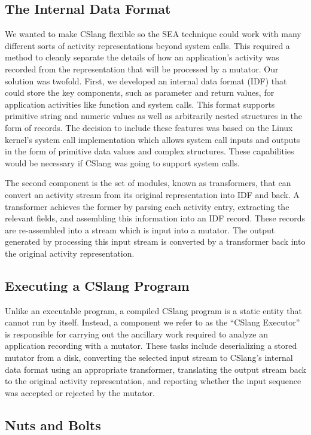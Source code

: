 \subsection{The Internal Data Format}

We wanted to make CSlang flexible
so the SEA technique
could
work with many different sorts of
activity representations beyond system calls.
This required a method to cleanly separate the details of how
an application's activity was recorded from the representation that will be
processed by a mutator.
Our solution was twofold.  First, we developed an internal data format
(IDF) that
could store the key components, such as parameter and return values,
for application activities like function
and system calls.  This format supports primitive string and numeric
values as well as arbitrarily nested structures in the form of records.
The decision to include these features
was based on the Linux kernel's system call implementation
which allows system call inputs and outputs in the form of primitive data
values and complex structures.
These capabilities would be necessary
if CSlang was going to support system calls.

The second component is the set of modules, known as transformers, that can
convert an activity stream from its original representation into IDF and
back.  A transformer achieves the former by parsing each activity entry,
extracting the relevant fields, and assembling this information into an IDF
record.  These records are re-assembled into a stream which is input into a
mutator.
The output generated by processing this input stream
is converted by a transformer
back into the original activity representation.

\subsection{Executing a CSlang Program}

Unlike an executable program, a compiled CSlang program is a static entity
that cannot run by itself.  Instead, a component we refer to as the
``CSlang Executor'' is responsible for carrying out the ancillary work
required to analyze an application recording with a mutator.
These tasks include deserializing a stored mutator from a disk,
converting the selected input stream
to CSlang's internal data format
using an appropriate transformer,
translating the output stream back to the original activity representation,
and reporting whether the input sequence was
accepted or rejected by the mutator.

\subsection{Nuts and Bolts}

